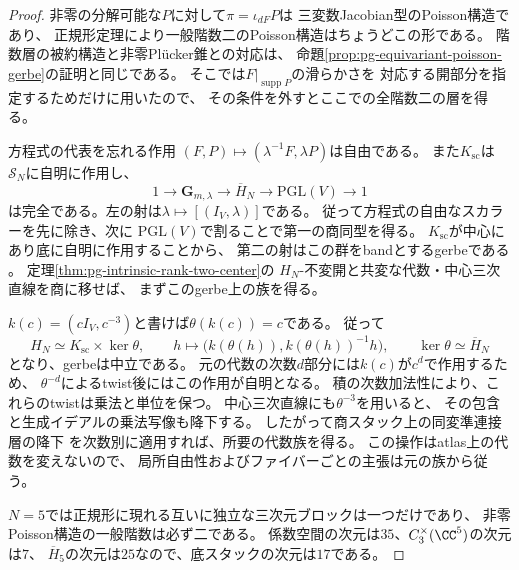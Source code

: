 \begin{proof}
非零の分解可能な$P$に対して$\pi=\iota_{dF}P$は
三変数Jacobian型のPoisson構造であり、
正規形定理により一般階数二のPoisson構造はちょうどこの形である。
階数層の被約構造と非零Pl\"ucker錐との対応は、
命題\ref{prop:pg-equivariant-poisson-gerbe}の証明と同じである。
そこでは$F|_{\operatorname{supp}P}$の滑らかさを
対応する開部分を指定するためだけに用いたので、
その条件を外すとここでの全階数二の層を得る。

方程式の代表を忘れる作用
$(F,P)\mapsto(\lambda^{-1}F,\lambda P)$は自由である。
また$K_{\mathrm{sc}}$は$\mathcal S_N$に自明に作用し、
\begin{equation}
 1\longrightarrow\mathbf G_{m,\lambda}
 \longrightarrow\overline H_N
 \longrightarrow\mathrm{PGL}(V)\longrightarrow1
 \label{eq:pg-intrinsic-effective-group}
\end{equation}
は完全である。左の射は$\lambda\mapsto[(I_V,\lambda)]$である。
従って方程式の自由なスカラーを先に除き、次に
$\mathrm{PGL}(V)$で割ることで第一の商同型を得る。
$K_{\mathrm{sc}}$が中心にあり底に自明に作用することから、
第二の射はこの群をbandとするgerbeである
\cite[Lemma~78.27.1, Tag~\texttt{06PD}]{PStacks}。
定理\ref{thm:pg-intrinsic-rank-two-center}の
$H_N$-不変開と共変な代数・中心三次直線を商に移せば、
まずこのgerbe上の族を得る。

$k(c)=(cI_V,c^{-3})$と書けば$\theta(k(c))=c$である。
従って
\begin{equation}
 H_N\simeq K_{\mathrm{sc}}\times\ker\theta,
 \qquad
 h\longmapsto
 \bigl(k(\theta(h)),k(\theta(h))^{-1}h\bigr),
 \qquad
 \ker\theta\simeq\overline H_N
 \label{eq:pg-intrinsic-character-splitting}
\end{equation}
となり、gerbeは中立である。
元の代数の次数$d$部分には$k(c)$が$c^d$で作用するため、
$\theta^{-d}$によるtwist後にはこの作用が自明となる。
積の次数加法性により、これらのtwistは乗法と単位を保つ。
中心三次直線にも$\theta^{-3}$を用いると、
その包含と生成イデアルの乗法写像も降下する。
したがって商スタック上の同変準連接層の降下
\cite[Proposition~96.14.3, Tag~\texttt{06WT}]{PStacks}
を次数別に適用すれば、所要の代数族を得る。
この操作はatlas上の代数を変えないので、
局所自由性およびファイバーごとの主張は元の族から従う。

$N=5$では正規形に現れる互いに独立な三次元ブロックは一つだけであり、
非零Poisson構造の一般階数は必ず二である。
係数空間の次元は$35$、$C_3^\times(\CC^5)$の次元は$7$、
$\overline H_5$の次元は$25$なので、底スタックの次元は$17$である。
\end{proof}

